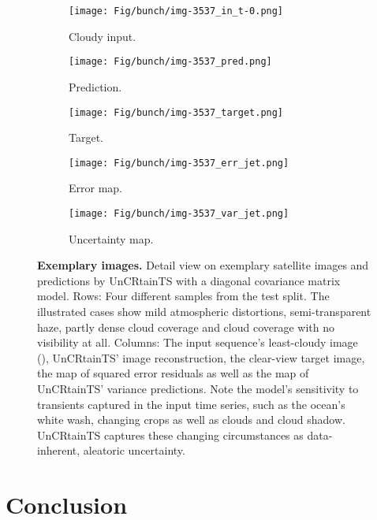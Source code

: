 \documentclass[10pt,twocolumn,letterpaper]{article}
\let\oldtextbf\textbf
\renewcommand{\textbf}[1]{\oldtextbf{\boldmath #1}}
\begin{document}
\begin{figure*}[!htb]
  \begin{subfigure}[b]{0.17\linewidth}
    \texttt{[image: Fig/bunch/img-3537\_in\_t-0.png]}
    \caption{Cloudy input.}
  \end{subfigure}
  \begin{subfigure}[b]{0.17\linewidth}
    \texttt{[image: Fig/bunch/img-3537\_pred.png]}
    \caption{Prediction.}
  \end{subfigure}
  \begin{subfigure}[b]{0.17\linewidth}
    \texttt{[image: Fig/bunch/img-3537\_target.png]}
    \caption{Target.}
  \end{subfigure}
  \begin{subfigure}[b]{0.17\linewidth}
    \texttt{[image: Fig/bunch/img-3537\_err\_jet.png]}
    \caption{Error map.}
  \end{subfigure}   
  \begin{subfigure}[b]{0.17\linewidth}
    \texttt{[image: Fig/bunch/img-3537\_var\_jet.png]}
    \caption{Uncertainty map.}
  \end{subfigure}
  
  \caption{\textbf{Exemplary images.} Detail view on exemplary satellite images and predictions by UnCRtainTS with a diagonal covariance matrix model. Rows: Four different samples from the test split. The illustrated cases show mild atmospheric distortions, semi-transparent haze, partly dense cloud coverage and cloud coverage with no visibility at all. Columns: The input sequence's least-cloudy image (), UnCRtainTS' image reconstruction, the clear-view target image, the map of squared error residuals as well as the map of UnCRtainTS' variance predictions. Note the model's sensitivity to transients captured in the input time series, such as the ocean's white wash, changing crops as well as clouds and cloud shadow. UnCRtainTS captures these changing circumstances as data-inherent, aleatoric uncertainty. 
  }
  \label{fig:bunch_of_plots}
\end{figure*}

\section{Conclusion}
\end{document}

